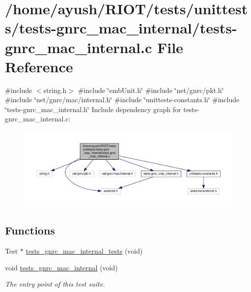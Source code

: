 \hypertarget{tests-gnrc__mac__internal_8c}{}\section{/home/ayush/\+R\+I\+O\+T/tests/unittests/tests-\/gnrc\+\_\+mac\+\_\+internal/tests-\/gnrc\+\_\+mac\+\_\+internal.c File Reference}
\label{tests-gnrc__mac__internal_8c}
{\ttfamily \#include $<$string.\+h$>$}\newline
{\ttfamily \#include \char`\"{}emb\+Unit.\+h\char`\"{}}\newline
{\ttfamily \#include \char`\"{}net/gnrc/pkt.\+h\char`\"{}}\newline
{\ttfamily \#include \char`\"{}net/gnrc/mac/internal.\+h\char`\"{}}\newline
{\ttfamily \#include \char`\"{}unittests-\/constants.\+h\char`\"{}}\newline
{\ttfamily \#include \char`\"{}tests-\/gnrc\+\_\+mac\+\_\+internal.\+h\char`\"{}}\newline
Include dependency graph for tests-\/gnrc\+\_\+mac\+\_\+internal.c\+:
\nopagebreak
\begin{figure}[H]
\begin{center}
\leavevmode
\includegraphics[width=350pt]{tests-gnrc__mac__internal_8c__incl}
\end{center}
\end{figure}
\subsection*{Functions}
\textbf{ }\par
\begin{DoxyCompactItemize}
\item 
Test $\ast$ \hyperlink{tests-gnrc__mac__internal_8c_a0716be01eaf3a53eadb1b5bf0bb9be24}{tests\+\_\+gnrc\+\_\+mac\+\_\+internal\+\_\+tests} (void)
\item 
void \hyperlink{group__unittests_ga4520245974f5c91b71a68215b4910126}{tests\+\_\+gnrc\+\_\+mac\+\_\+internal} (void)
\begin{DoxyCompactList}\small\item\em The entry point of this test suite. \end{DoxyCompactList}\end{DoxyCompactItemize}



